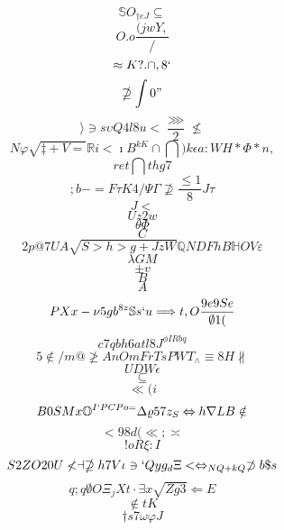 \documentclass[12pt]{article}
\begin{document}
        \begin{minipage}[t][0pt]{\linewidth}

        \[\mathbb{S} O_{\dagger e J}\subseteq\]
\[O.o\frac{(jwY,}{/}\]
\[\approx K ? .\cap , 8 `\]
\[\nsupseteq\int 0 "\]
\[\rangle\ni s\upsilon Q 4 l 8 u <\frac{\ggg}{ 2}\nleq\]
\[N\varphi\sqrt{\ddagger + V =}\mathbb{R} i <\imath B^{kK}\cap\bigcap ) k\epsilon a : W H *\Phi * n ,\]
\[ret\bigcap t h g 7\]
\[;b-=F\tau K 4 /\Psi\Gamma\nsupseteq\frac{\leq 1}{ 8} J\tau\]
\[J<\]
\[U {z2w}\]
\[\theta\Phi\]
\[C\]
\[2p@7UA\sqrt{S>h>g+JzW}\mathbb{Q} N D F h B\mathbb{H} O V\varepsilon\]
\[\lambda G M\]
\[\pm v\]
\[B\]
\[A\]
\[PXx-\nu 5 g b^{8z}\mathbb{S} s ` u\Longrightarrow t , O\frac{9e9Se}{\emptyset 1 (}\]
\[c7qbh6atl8J^{\phi I R b q}\]
\[5\notin / m @\ngeq A n O m F r T s P W T_{\land}\equiv 8 H\nparallel\]
\[UDW\epsilon\]
\[\subseteq\]
\[\ll ( i\]
\[B0SMx\mathbb{O}^{I`PCPo=}\Delta\varrho 5 7 z_{S}\Leftrightarrow h\nabla L B\notin\]
\[<98d(\ll ;\asymp\]
\[!oR\xi : I\]
\[S2ZO20U\nless\dashv\nsupseteq h 7 V\iota\ni ` Q y g_{d}\Xi <\Leftrightarrow_{NQ+kQ}\not\supset b\$ s\]
\[q;q\emptyset O\Xi_{j}Xt\cdot\exists x\sqrt{Zg3}\Longleftarrow E\]
\[\notin t K\]
\[\dagger s 7\omega\varphi J
        \]
\end{minipage}
\end{document}
